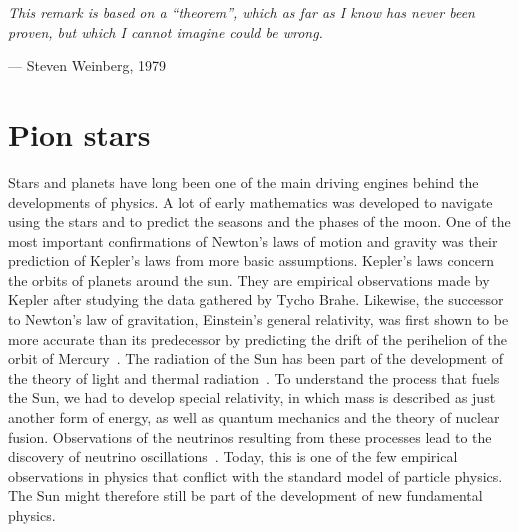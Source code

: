 
\epigraph{\emph{\noindent
This remark is based on a ``theorem'', which as far as I know has never been proven, but which I cannot imagine could be wrong.
}}
{
    --- Steven Weinberg, 1979~\autocite{weinbergPhenomenologicalLagrangians1979a}
}


\section{Pion stars}

Stars and planets have long been one of the main driving engines behind the developments of physics.
A lot of early mathematics was developed to navigate using the stars and to predict the seasons and the phases of the moon.
One of the most important confirmations of Newton's laws of motion and gravity was their prediction of Kepler's laws from more basic assumptions.
Kepler's laws concern the orbits of planets around the sun.
They are empirical observations made by Kepler after studying the data gathered by Tycho Brahe.
Likewise, the successor to Newton's law of gravitation, Einstein's general relativity, was first shown to be more accurate than its predecessor by predicting the drift of the perihelion of the orbit of Mercury~\autocite{carrollSpacetimeGeometryIntroduction2019}.
The radiation of the Sun has been part of the development of the theory of light and thermal radiation~\autocite{hemmerTermiskFysikk2002}.
To understand the process that fuels the Sun, we had to develop special relativity, in which mass is described as just another form of energy, as well as quantum mechanics and the theory of nuclear fusion.
Observations of the neutrinos resulting from these processes lead to the discovery of neutrino oscillations~\autocite{prialnikIntroductionTheoryStellar2000}.
Today, this is one of the few empirical observations in physics that conflict with the standard model of particle physics.
The Sun might therefore still be part of the development of new fundamental physics.

